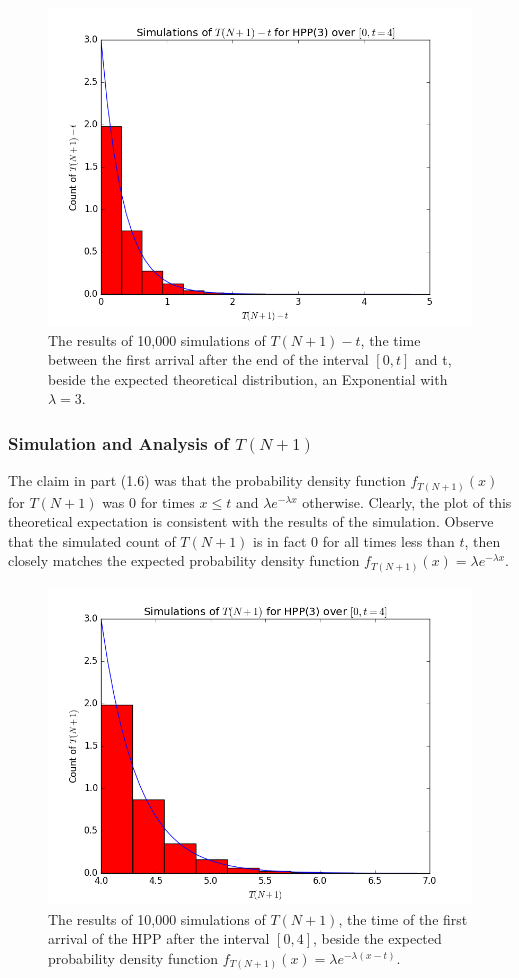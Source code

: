 \documentclass[11pt, oneside]{article}   	%
\begin{document}
\begin{figure}[H]
\includegraphics[scale=.45]{hpp_tn1_t}
\caption{The results of 10,000 simulations of $T(N+1)-t$, the time between the first arrival after the end of the interval $[0,t]$ and t, beside the expected theoretical distribution, an Exponential with $\lambda=3$.}
\label{fig:x}
\end{figure}

\subsubsection{Simulation and Analysis of $T(N+1)$}
The claim in part (1.6) was that the probability density function $f_{T(N+1)}(x)$ for $T(N+1)$ was 0 for times $x \leq t$ and $\lambda e^{-\lambda x}$ otherwise. Clearly, the plot of this theoretical expectation is consistent with the results of the simulation. Observe that the simulated count of $T(N+1)$ is in fact 0 for all times less than $t$, then closely matches the expected probability density function $f_{T(N+1)}(x)=\lambda e^{-\lambda x}$.
\begin{figure}[H]
\includegraphics[scale=.5]{hpp_tn1}
\caption{The results of 10,000 simulations of $T(N+1)$, the time of the first arrival of the HPP after the interval $[0,4]$, beside the expected probability density function $f_{T(N+1)}(x)=\lambda e^{-\lambda (x - t)}$.}
\label{fig:x}
\end{figure}
\end{document}
